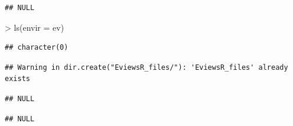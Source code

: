 \documentclass[
]{article}
\newenvironment{Shaded}{\begin{snugshade}}{\end{snugshade}}
\newcommand{\AttributeTok}[1]{\textcolor[rgb]{0.77,0.63,0.00}{#1}}
\newcommand{\FunctionTok}[1]{\textcolor[rgb]{0.00,0.00,0.00}{#1}}
\newcommand{\NormalTok}[1]{#1}
\newcommand{\SpecialCharTok}[1]{\textcolor[rgb]{0.00,0.00,0.00}{#1}}
\begin{document}
\begin{Shaded}
\end{Shaded}

\begin{verbatim}
## NULL
\end{verbatim}

\begin{Shaded}
\begin{Highlighting}[]
\SpecialCharTok{\textgreater{}} \FunctionTok{ls}\NormalTok{(}\AttributeTok{envir =}\NormalTok{ ev)}
\end{Highlighting}
\end{Shaded}

\begin{verbatim}
## character(0)
\end{verbatim}

\begin{verbatim}
## Warning in dir.create("EviewsR_files/"): 'EviewsR_files' already exists
\end{verbatim}

\begin{Shaded}
\end{Shaded}

\begin{verbatim}
## NULL
\end{verbatim}

\begin{Shaded}
\end{Shaded}

\begin{verbatim}
## NULL
\end{verbatim}

\begin{Shaded}
\end{Shaded}
\end{document}
